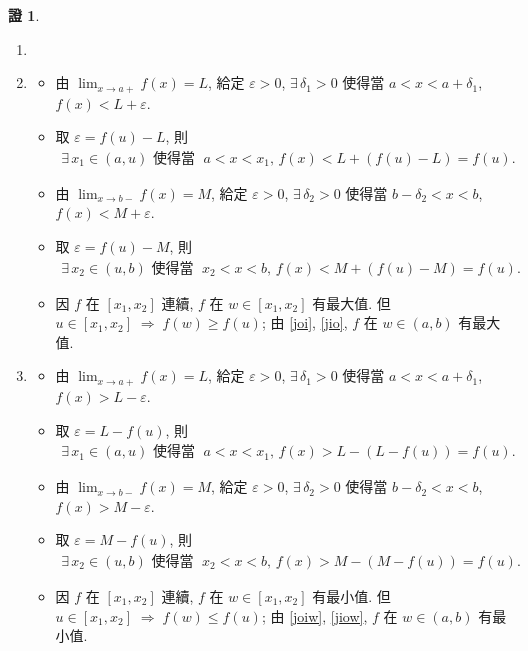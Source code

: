 \documentclass[12pt]{extarticle}
\newcommand{\ds}{\displaystyle}
\newcommand{\ie}{\;\Longrightarrow\;}
\theoremstyle{definition}
\newtheorem*{prf}{證}
\begin{document}
\begin{prf}
  \begin{enumerate}\setlength\itemsep{0em}
    \item[]
    \item 
    \begin{itemize}\setlength\itemsep{0em}
      \item 由 $\ds\lim_{x\to a+}f(x) = L$, 給定 $\varepsilon > 0$, $\exists\,\delta_1 > 0$ 使得當 $a < x < a + \delta_1$, $f(x) < L + \varepsilon$. 
      \item 取 $\varepsilon = f(u) - L$, 則
        \begin{align}\label{joi}
          \exists\,x_1\in (a, u) \text{ 使得當 }\; a < x < x_1, \,f(x) < L + (f(u) - L) = f(u).
        \end{align}
      \item 由 $\ds \lim_{x\to b-}f(x) = M$, 給定 $\varepsilon > 0$, $\exists\,\delta_2 > 0$ 使得當 $b - \delta_2 < x < b$, $f(x) < M + \varepsilon$. 
      \item 取 $\varepsilon = f(u) - M$, 則
        \begin{align}\label{jio}
          \exists\,x_2\in (u, b)\text{ 使得當 }\; x_2 < x < b, \,f(x) < M + (f(u) - M) = f(u).
        \end{align}
      \item 因 $f$ 在 $[x_1, x_2]$ 連續, $f$ 在 $w\in[x_1, x_2]$ 有最大值. 但 $u\in[x_1, x_2]\ie f(w)\geqslant f(u)$;  由 \eqref{joi}, \eqref{jio}, $f$ 在 $w\in(a, b)$ 有最大值. 
    \end{itemize}
  \item 
    \begin{itemize}\setlength\itemsep{0em}
      \item 由 $\ds \lim_{x\to a+}f(x) = L$, 給定 $\varepsilon > 0$, $\exists\,\delta_1 > 0$ 使得當 $a < x < a + \delta_1$, $f(x) > L - \varepsilon$. 
      \item 取 $\varepsilon = L - f(u)$, 則
        \begin{align}\label{joiw}
          \exists\,x_1\in (a, u) \text{ 使得當 }\; a < x < x_1, \,f(x) > L - (L - f(u)) = f(u).
        \end{align}
      \item 由 $\ds \lim_{x\to b-}f(x) = M$, 給定 $\varepsilon > 0$, $\exists\,\delta_2 > 0$ 使得當 $b - \delta_2 < x < b$, $f(x) > M - \varepsilon$. 
      \item 取 $\varepsilon = M - f(u)$, 則
        \begin{align}\label{jiow}
          \exists\,x_2\in (u, b)\text{ 使得當 }\; x_2 < x < b, \,f(x) > M - (M - f(u)) = f(u).
        \end{align}
      \item 因 $f$ 在 $[x_1, x_2]$ 連續, $f$ 在 $w\in[x_1, x_2]$ 有最小值. 但 $u\in[x_1, x_2]\ie f(w)\leqslant f(u)$;  由 \eqref{joiw}, \eqref{jiow}, $f$ 在 $w\in(a, b)$ 有最小值. 
    \end{itemize}
  \end{enumerate}
\end{prf}
\end{document}
